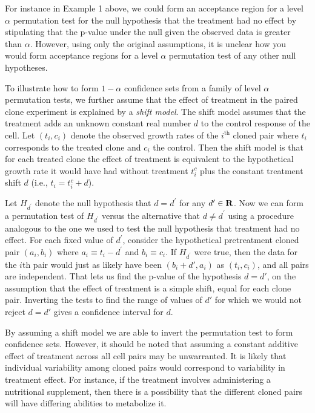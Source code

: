 For instance in Example 1 above, we could form an acceptance region for a level
$\alpha$ permutation test for the null hypothesis that the treatment had no
effect by stipulating that the p-value under the null given the observed data
is greater than $\alpha$.  However, using only the original assumptions, it is
unclear how you would form acceptance regions for a level $\alpha$ permutation
test of any other null hypotheses. 

\begin{example}[continues=exa:cont] To illustrate how to form $1-\alpha$
confidence sets from a family of level $\alpha$ permutation tests, we further
assume that the effect of treatment in the paired clone experiment is explained
by a \emph{shift model}.  The shift model assumes that the treatment
adds an unknown constant real number $d$ to the control response of the cell.
Let $(t_i, c_i)$ denote the observed growth rates of the $i^\text{th}$ cloned
pair where $t_i$ corresponds to the treated clone and $c_i$ the control.  Then
the shift model is that for each treated clone the effect of treatment is
equivalent to the hypothetical growth rate it would have had without treatment
$t_i^c$ plus the constant treatment shift $d$ (i.e., $t_i = t_i^c + d$).

Let $H_{d^\prime}$ denote the null hypothesis that $d=d^\prime$ for any
$d^\prime \in \mathbf{R}$.  Now we can form a permutation test of $H_{d^\prime}$
versus the alternative that $d \neq d^\prime$ using a procedure analogous to the
one we used to test the null hypothesis that treatment had no
effect. For each fixed value of $d^\prime$, consider the hypothetical
pretreatment cloned pair $(a_i, b_i)$ where $a_i\equiv t_i-d^\prime$ and $b_i
\equiv c_i$. If $H_{d^\prime}$ were true, then the data for the $i$th pair would
just as likely have been $(b_i+d', a_i)$ as $(t_i, c_i)$, and all pairs are
independent.
That lets us find the p-value of the hypothesis $d=d'$, on the assumption that
the effect of treatment is a simple shift, equal for each clone pair.
Inverting the tests to find the range of values of $d'$ for which we would not
reject $d=d'$ gives a confidence interval for $d$.

By assuming a shift model we are able to invert the permutation test to form
confidence sets.  However, it should be noted that assuming a constant additive
effect of treatment across all cell pairs may be unwarranted. It is likely
that individual variability among cloned pairs would correspond to variability
in treatment effect.  For instance, if the treatment involves administering a
nutritional supplement, then there is a possibility that the different cloned
pairs will have differing abilities to metabolize it.


\end{example}

